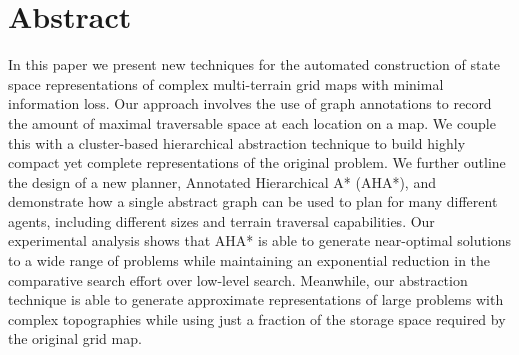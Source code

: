\section{Abstract}
In this paper we present new techniques for the automated construction of state space representations of complex multi-terrain grid maps with minimal information loss. Our approach involves the use of graph annotations to record the amount of maximal traversable space at each location on a map. We couple this with a cluster-based hierarchical abstraction technique to build highly compact yet complete representations of the original problem. We further outline the design of a new planner, Annotated Hierarchical A* (AHA*), and demonstrate how a single abstract graph can be used to plan for many different agents, including different sizes and terrain traversal capabilities. 
Our experimental analysis shows that AHA* is able to generate near-optimal solutions to a wide range of problems while maintaining an exponential reduction in the comparative search effort over low-level search. Meanwhile, our abstraction technique is able to generate approximate representations of large problems with complex topographies while using just a fraction of the storage space required by the original grid map.
